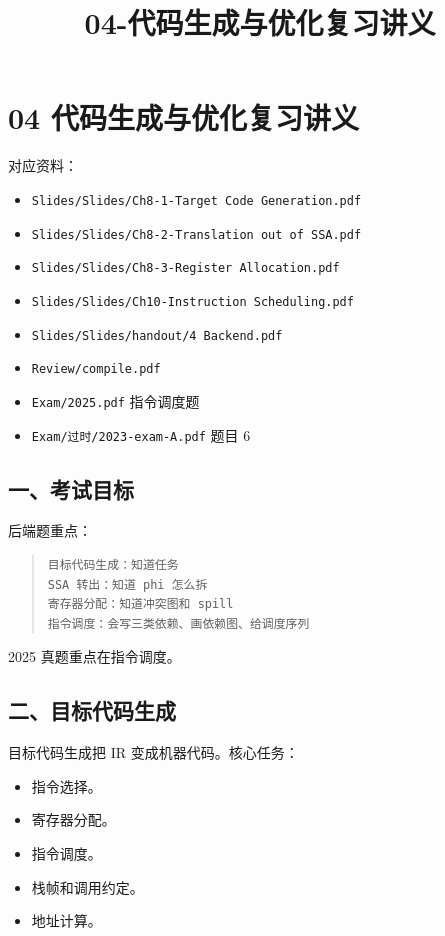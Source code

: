 \documentclass[UTF8,zihao=-4]{ctexart}
\title{04-代码生成与优化复习讲义}
\author{}
\date{}
\begin{document}
\maketitle
\setcounter{tocdepth}{1}
\tableofcontents
\newpage
\section{04 代码生成与优化复习讲义}


对应资料：


\begin{itemize}
\item \texttt{Slides/Slides/Ch8-1-Target Code Generation.pdf}
\item \texttt{Slides/Slides/Ch8-2-Translation out of SSA.pdf}
\item \texttt{Slides/Slides/Ch8-3-Register Allocation.pdf}
\item \texttt{Slides/Slides/Ch10-Instruction Scheduling.pdf}
\item \texttt{Slides/Slides/handout/4 Backend.pdf}
\item \texttt{Review/compile.pdf}
\item \texttt{Exam/2025.pdf} 指令调度题
\item \texttt{Exam/过时/2023-exam-A.pdf} 题目 6
\end{itemize}


\subsection{一、考试目标}


后端题重点：


\begin{quote}
\footnotesize
\begin{verbatim}
目标代码生成：知道任务
SSA 转出：知道 phi 怎么拆
寄存器分配：知道冲突图和 spill
指令调度：会写三类依赖、画依赖图、给调度序列
\end{verbatim}
\end{quote}


2025 真题重点在指令调度。


\subsection{二、目标代码生成}


目标代码生成把 IR 变成机器代码。核心任务：


\begin{itemize}
\item 指令选择。
\item 寄存器分配。
\item 指令调度。
\item 栈帧和调用约定。
\item 地址计算。
\end{itemize}
\end{document}
